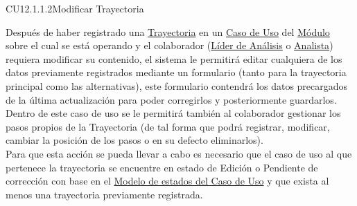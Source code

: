 	\begin{UseCase}{CU12.1.1.2}{Modificar Trayectoria}{
	
		Después de haber registrado una \hyperlink{entidadTray}{Trayectoria} en un \hyperlink{casoUso}{Caso de Uso} del \hyperlink{moduloEntidad}{Módulo} sobre el cual se está operando y el colaborador (\hyperlink{jefe}{Líder de Análisis} o \hyperlink{analista}{Analista}) requiera modificar su contenido, el sistema le permitirá editar cualquiera de los datos previamente registrados mediante un formulario (tanto para la trayectoria principal como las alternativas), este formulario contendrá los datos precargados de la última actualización para poder corregirlos y posteriormente guardarlos.\\
		
		Dentro de este caso de uso se le permitirá también al colaborador gestionar los pasos propios de la Trayectoria (de tal forma que podrá registrar, modificar, cambiar la posición de los pasos o en su defecto eliminarlos).\\
		
		Para que esta acción se pueda llevar a cabo es necesario que el caso de uso al que pertenece la trayectoria se encuentre en estado de Edición o Pendiente de corrección con base en el \hyperlink{edoCU}{Modelo de estados del Caso de Uso} y que exista al menos una trayectoria previamente registrada.
		
}
\end{UseCase}
